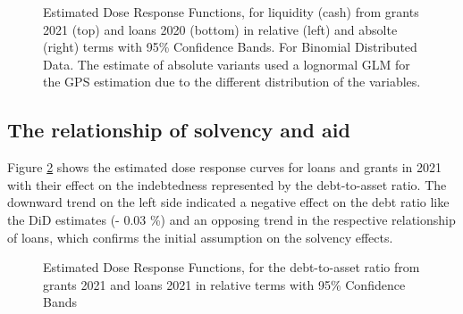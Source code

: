 \begin{figure}
    \centering
    
    \decoRule
    \caption[Response curves for grants and loans]{Estimated Dose Response Functions, for liquidity (cash) from grants 2021 (top) and loans 2020 (bottom) in relative (left) and absolte (right) terms with 95\% Confidence Bands. For Binomial Distributed Data. The estimate of absolute variants used a lognormal GLM for the GPS estimation due to the different distribution of the variables.}
    \label{fig:Curve1}
\end{figure}


\subsection{The relationship of solvency and aid}


Figure \ref{fig:Curve2} shows the estimated dose response curves for loans and grants in 2021 with their effect on the indebtedness represented by the debt-to-asset ratio.
The downward trend on the left side indicated a negative effect on the debt ratio like the DiD estimates (- 0.03 \%) and an opposing trend in the respective relationship of loans, which confirms the initial assumption on the solvency effects.




\begin{figure}
    \centering
    
    \decoRule
    \caption[Response curves for indebtedness through aid]{Estimated Dose Response Functions, for the debt-to-asset ratio from grants 2021 and loans 2021 in relative terms with 95\% Confidence Bands}
    \label{fig:Curve2}
\end{figure}


